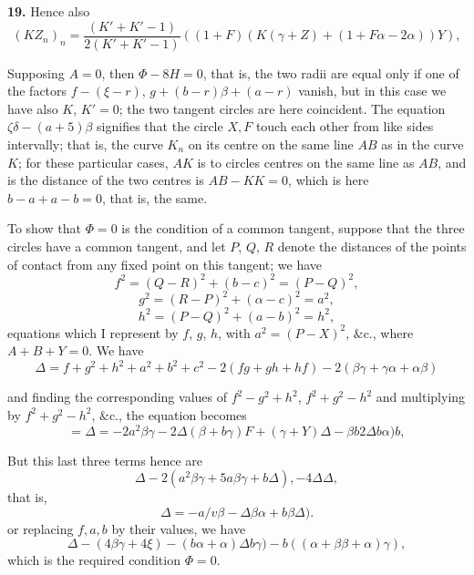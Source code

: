\documentclass[11pt,a4paper]{article}
\begin{document}
\textbf{19.} Hence also
\[
(KZ_n)_n = \frac{(K' + K' - 1)}{2(K' + K' - 1)}((1 + F)(K(\gamma + Z) + (1 + F\alpha - 2\alpha))Y),
\]

Supposing $A = 0$, then $\Phi - 8H = 0$, that is, the two radii are equal only if one of the factors $f - (\xi - r)$, $g + (b - r)\beta + (a - r)$ vanish, but in this case we have also $K$, $K' = 0$; the two tangent circles are here coincident. The equation $\zeta\delta - (a + 5)\beta$ signifies that the circle $X, F$ touch each other from like sides intervally; that is, the curve $K_n$ on its centre on the same line $A B$ as in the curve $K$; for these particular cases, $A K$ is to circles centres on the same line as $A B$, and is the distance of the two centres is $A B - K K = 0$, which is here $b - a + a - b = 0$, that is, the same.

To show that $\Phi = 0$ is the condition of a common tangent, suppose that the three circles have a common tangent, and let $P$, $Q$, $R$ denote the distances of the points of contact from any fixed point on this tangent; we have
\[
f^2 = (Q - R)^2 + (b - c)^2 = (P - Q)^2,
\]
\[
g^2 = (R - P)^2 + (\alpha - c)^2 = a^2,
\]
\[
h^2 = (P - Q)^2 + (a - b)^2 = h^2,
\]
equations which I represent by $f$, $g$, $h$, with $a^2 = (P - X)^2$, $\&\text{c.}$, where $A + B + Y = 0$. We have
\[
\Delta = f + g^2 + h^2 + a^2 + b^2 + c^2 - 2(fg + gh + hf) - 2(\beta \gamma + \gamma\alpha + \alpha\beta)
\]

and finding the corresponding values of $f^2 - g^2 + h^2$, $f^2 + g^2 - h^2$ and multiplying by $f^2 + g^2 - h^2$, $\&\text{c.}$, the equation becomes
\[
= \Delta = - 2a^2\beta \gamma - 2\Delta(\beta + b\gamma)F + (\gamma + Y)\Delta - \beta b 2\Delta b\alpha)b,
\]

But this last three terms hence are
\[
\Delta - 2(a^2\beta\gamma + 5a\beta\gamma + b\Delta), - 4\Delta\Delta,
\]
that is,
\[
\Delta = -a/v\beta - \Delta\beta\alpha + b\beta\Delta).
\]
or replacing $f, a, b$ by their values, we have
\[
\Delta - (4\beta\gamma + 4\xi) - (b\alpha + \alpha)\Delta b\gamma) - b((\alpha + \beta\beta + \alpha)\gamma),
\]
which is the required condition $\Phi = 0$.
\end{document}
